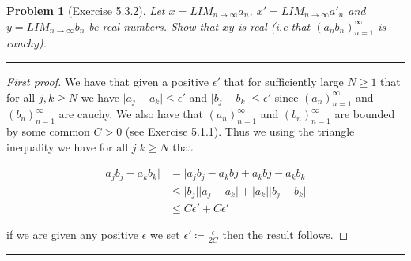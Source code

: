 \documentclass{article}
\newcommand{\lined}{\noindent\rule{\textwidth}{1pt}}
\newtheorem*{problem}{Problem}
\begin{document}
	\newpage
	
	\begin{problem}[Exercise 5.3.2]
		Let $x = LIM_{n \rightarrow \infty} a_n$, $x' = LIM_{n \rightarrow \infty} a'_n$ and $y = LIM_{n \rightarrow \infty} b_n$ be real numbers. Show that $xy$ is real (i.e that $(a_{n}b_{n})_{n = 1}^{\infty}$ is cauchy).
	\end{problem}
	
	\lined
		\begin{proof}[First proof]
			We have that given a positive $\epsilon'$ that for sufficiently large $N \geq 1$ that for all $j,k \geq N$ we have $\lvert a_j - a_k \rvert \leq \epsilon'$ and $\lvert b_j - b_k \rvert \leq \epsilon'$ since 
$(a_n)_{n = 1}^{\infty}$ and $(b_n)_{n = 1}^{\infty}$ are cauchy. We also have that $(a_n)_{n = 1}^{\infty}$ and $(b_n)_{n = 1}^{\infty}$  are bounded by some common  $C > 0$ (see Exercise 5.1.1). Thus we using the triangle inequality we have for all $j.k \geq N$ that 

\begin{align*}
	\lvert a_{j}b_{j} -  a_{k}b_{k} \rvert & = \lvert a_{j}b_{j} - a_{k}b{j} + a_{k}b{j} -  a_{k}b_{k} \rvert \\ & \leq
	 \lvert b_j \rvert \lvert a_j - a_k \rvert + \lvert a_k \rvert\lvert b_j - b_k \rvert \\ & \leq C\epsilon' + C\epsilon'
\end{align*}

\noindent if we are given any positive $\epsilon$ we set $\epsilon' \coloneqq \frac{\epsilon}{2C}$ then the result follows. 
		\end{proof}
	\lined
	
\end{document}
